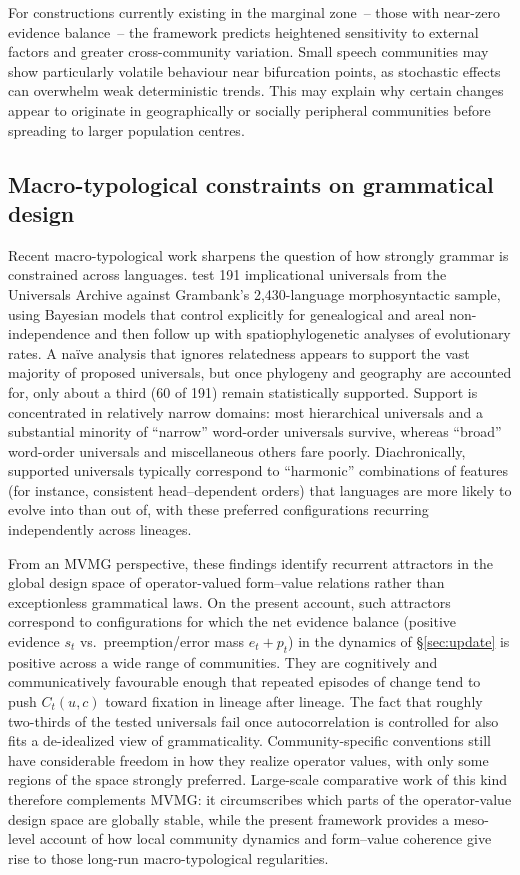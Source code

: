 \documentclass[12pt,letterpaper]{article}
\begin{document}
For constructions currently existing in the marginal zone~-- those with near-zero evidence balance~-- the framework predicts heightened sensitivity to external factors and greater cross-community variation. Small speech communities may show particularly volatile behaviour near bifurcation points, as stochastic effects can overwhelm weak deterministic trends. This may explain why certain changes appear to originate in geographically or socially peripheral communities before spreading to larger population centres.

\subsection{Macro-typological constraints on grammatical design}

Recent macro-typological work sharpens the question of how strongly grammar is constrained across languages. \textcite{verkerk2025} test 191 implicational universals from the Universals Archive against Grambank's 2{,}430-language morphosyntactic sample, using Bayesian models that control explicitly for genealogical and areal non-independence and then follow up with spatiophylogenetic analyses of evolutionary rates. A naïve analysis that ignores relatedness appears to support the vast majority of proposed universals, but once phylogeny and geography are accounted for, only about a third (60 of 191) remain statistically supported. Support is concentrated in relatively narrow domains: most hierarchical universals and a substantial minority of \enquote{narrow} word-order universals survive, whereas \enquote{broad} word-order universals and miscellaneous others fare poorly. Diachronically, supported universals typically correspond to \enquote{harmonic} combinations of features (for instance, consistent head--dependent orders) that languages are more likely to evolve into than out of, with these preferred configurations recurring independently across lineages.

From an MVMG perspective, these findings identify recurrent attractors in the global design space of operator-valued form--value relations rather than exceptionless grammatical laws. On the present account, such attractors correspond to configurations for which the net evidence balance (positive evidence $s_t$ vs.\ preemption/error mass $e_t+p_t$) in the dynamics of \S\ref{sec:update} is positive across a wide range of communities. They are cognitively and communicatively favourable enough that repeated episodes of change tend to push $C_t(u,c)$ toward fixation in lineage after lineage. The fact that roughly two-thirds of the tested universals fail once autocorrelation is controlled for also fits a de-idealized view of grammaticality. Community-specific conventions still have considerable freedom in how they realize operator values, with only some regions of the space strongly preferred. Large-scale comparative work of this kind therefore complements MVMG: it circumscribes which parts of the operator-value design space are globally stable, while the present framework provides a meso-level account of how local community dynamics and form--value coherence give rise to those long-run macro-typological regularities.
\end{document}
